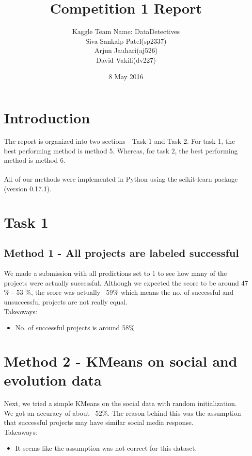 \documentclass{article}
\title{Competition 1 Report}
\author{Kaggle Team Name: DataDetectives \\ Siva Sankalp Patel(sp2337) \\ Arjun Jauhari(aj526) \\ David Vakili(dv227)}
\date{8 May 2016}
\begin{document}
\maketitle

\section*{Introduction}
The report is organized into two sections - Task 1 and Task 2. For task 1, the best performing method is method 5. Whereas, for task 2, the best performing method is method 6. \\
\\
All of our methods were implemented in Python using the scikit-learn package (version 0.17.1). 
 \\

\section*{Task 1}
\subsection*{Method 1 - All projects are labeled successful}
We made a submission with all predictions set to 1 to see how many of the projects were actually successful. Although we expected the score to be around 47 \% - 53 \%, the score was actually ~59\% which means the no. of successful and unsuccessful projects are not really equal. \\
Takeaways:\\
\vspace{-0.5cm}
\begin{itemize}
\item No. of successful projects is around 58\%
\end{itemize}
\section*{Method 2 - KMeans on social and evolution data}
Next, we tried a simple KMeans on the social data with random initialization. We got an accuracy of about ~52\%. The reason behind this was the assumption that successful projects may have similar social media response. \\
Takeaways:\\
\vspace{-0.5cm}
\begin{itemize}
\item It seems like the assumption was not correct for this dataset.
\end{itemize}
\end{document}
